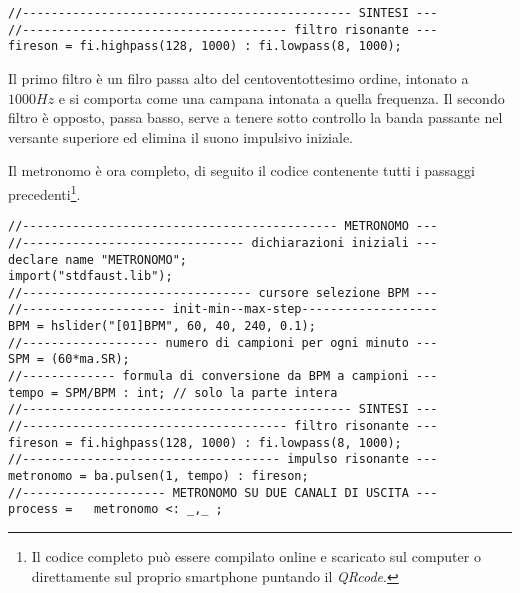 \begin{lstlisting}
//---------------------------------------------- SINTESI ---
//------------------------------------- filtro risonante ---
fireson = fi.highpass(128, 1000) : fi.lowpass(8, 1000);
\end{lstlisting}

Il primo filtro è un filro passa alto del centoventottesimo ordine, intonato a
$1000Hz$ e si comporta come una campana intonata a quella frequenza. Il secondo
filtro è opposto, passa basso, serve a tenere sotto controllo la banda passante nel
versante superiore ed elimina il suono impulsivo iniziale.

Il metronomo è ora completo, di seguito il codice contenente tutti i passaggi
precedenti\footnote{Il codice completo può essere compilato online e scaricato
sul computer o direttamente sul proprio smartphone puntando il \emph{QRcode}.}.

\begin{lstlisting}
//-------------------------------------------- METRONOMO ---
//------------------------------- dichiarazioni iniziali ---
declare name "METRONOMO";
import("stdfaust.lib");
//-------------------------------- cursore selezione BPM ---
//-------------------- init-min--max-step-------------------
BPM = hslider("[01]BPM", 60, 40, 240, 0.1);
//------------------- numero di campioni per ogni minuto ---
SPM = (60*ma.SR);
//------------- formula di conversione da BPM a campioni ---
tempo = SPM/BPM : int; // solo la parte intera
//---------------------------------------------- SINTESI ---
//------------------------------------- filtro risonante ---
fireson = fi.highpass(128, 1000) : fi.lowpass(8, 1000);
//------------------------------------ impulso risonante ---
metronomo = ba.pulsen(1, tempo) : fireson;
//-------------------- METRONOMO SU DUE CANALI DI USCITA ---
process =   metronomo <: _,_ ;
\end{lstlisting}
